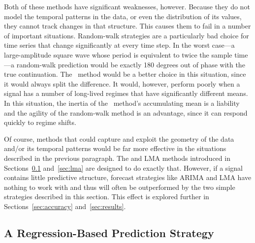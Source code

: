 Both of these methods have significant weaknesses, however.  Because
they do not model the temporal patterns in the data, or even the
distribution of its values, they cannot track changes in that
structure.  This causes them to fail in a number of important
situations.  Random-walk strategies are a particularly bad choice for
time series that change significantly at every time step.  In the
worst case---a large-amplitude square wave whose period is equivalent
to twice the sample time---a random-walk prediction would be exactly
180 degrees out of phase with the true continuation.  The \naive
~method would be a better choice in this situation, since it would
always split the difference.  It would, however, perform poorly when a
signal has a number of long-lived regimes that have significantly
different means.  In this situation, the inertia of the \naive
~method's accumulating mean is a liability and the agility of the
random-walk method is an advantage, since it can respond quickly to
regime shifts.

Of course, methods that could capture and exploit the geometry of the
data and/or its temporal patterns would be far more effective in the
situations described in the previous paragraph.  The \arima and LMA
methods introduced in Sections~\ref{sec:arima} and~\ref{sec:lma} are
designed to do exactly that.
However, if a signal contains little predictive structure, forecast
strategies like ARIMA and LMA have nothing to work with and thus will
often be outperformed by the two simple strategies described in this
section.  This effect is explored further in Sections~\ref{sec:accuracy}
and~\ref{sec:results}.


\subsection{A Regression-Based Prediction Strategy}
\label{sec:arima}



